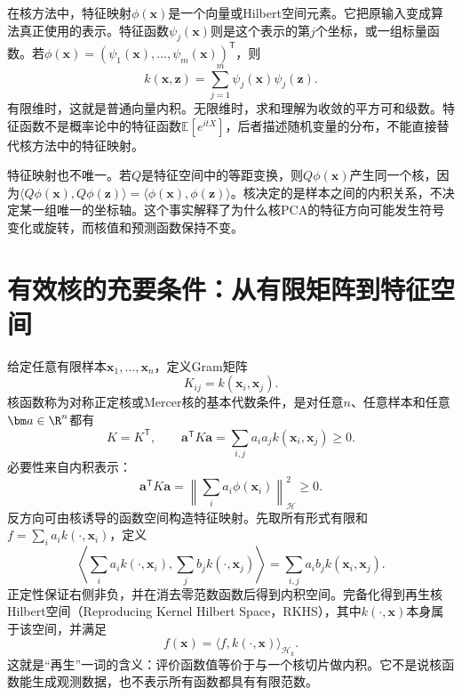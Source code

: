 在核方法中，特征映射$\phi(\bm x)$是一个向量或Hilbert空间元素。它把原输入变成算法真正使用的表示。特征函数$\psi_j(\bm x)$则是这个表示的第$j$个坐标，或一组标量函数。若$\phi(\bm x)=(\psi_1(\bm x),\ldots,\psi_m(\bm x))^{\mathsf T}$，则
\begin{equation}
 k(\bm x,\bm z)=\sum_{j=1}^{m}\psi_j(\bm x)\psi_j(\bm z).
 \label{eq:kernel-feature-functions}
\end{equation}
有限维时，这就是普通向量内积。无限维时，求和理解为收敛的平方可和级数。特征函数不是概率论中的特征函数$\mathbb E[e^{itX}]$，后者描述随机变量的分布，不能直接替代核方法中的特征映射。

特征映射也不唯一。若$Q$是特征空间中的等距变换，则$Q\phi(\bm x)$产生同一个核，因为$\langle Q\phi(\bm x),Q\phi(\bm z)\rangle=\langle\phi(\bm x),\phi(\bm z)\rangle$。核决定的是样本之间的内积关系，不决定某一组唯一的坐标轴。这个事实解释了为什么核PCA的特征方向可能发生符号变化或旋转，而核值和预测函数保持不变。

\section{有效核的充要条件：从有限矩阵到特征空间}
给定任意有限样本$\bm x_1,\ldots,\bm x_n$，定义Gram矩阵
\begin{equation}
 K_{ij}=k(\bm x_i,\bm x_j).
\end{equation}
核函数称为对称正定核或Mercer核的基本代数条件，是对任意$n$、任意样本和任意$\bm a\in\R^n$都有
\begin{equation}
 K=K^{\mathsf T},\qquad
 \bm a^{\mathsf T}K\bm a=\sum_{i,j}a_ia_jk(\bm x_i,\bm x_j)\geq0.
 \label{eq:kernel-psd-condition}
\end{equation}
必要性来自内积表示：
\begin{equation}
 \bm a^{\mathsf T}K\bm a
 =\left\|\sum_i a_i\phi(\bm x_i)\right\|_{\mathcal H}^2\geq0.
\end{equation}
反方向可由核诱导的函数空间构造特征映射。先取所有形式有限和$f=\sum_i a_i k(\cdot,\bm x_i)$，定义
\begin{equation}
 \left\langle\sum_i a_i k(\cdot,\bm x_i),
 \sum_j b_j k(\cdot,\bm x_j)\right\rangle
 =\sum_{i,j}a_ib_jk(\bm x_i,\bm x_j).
\end{equation}
正定性保证右侧非负，并在消去零范数函数后得到内积空间。完备化得到再生核Hilbert空间（Reproducing Kernel Hilbert Space，RKHS），其中$k(\cdot,\bm x)$本身属于该空间，并满足
\begin{equation}
 f(\bm x)=\langle f,k(\cdot,\bm x)\rangle_{\mathcal H_k}.
 \label{eq:reproducing-property}
\end{equation}
这就是“再生”一词的含义：评价函数值等价于与一个核切片做内积。它不是说核函数能生成观测数据，也不表示所有函数都具有有限范数。


